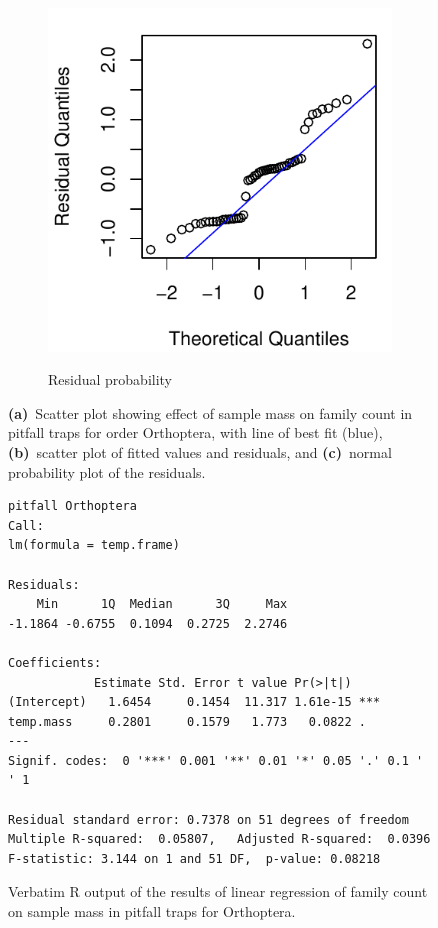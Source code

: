 \documentclass[10pt,letterpaper,twocolumn]{article}
\begin{document}
\begin{figure}[h]
\begin{subfigure}[b]{0.15\textwidth}
		\label{fig:pitfall_orthoptera_resid}
	\end{subfigure}
	~
	\begin{subfigure}[b]{0.15\textwidth}
		\caption{Residual probability}
		\includegraphics[width=\textwidth]{plots/mass-vs-count/qqplot/2015_pitfall_Orthoptera_qqplot.pdf}
		\label{fig:pitfall_orthoptera_qqplot}
	\end{subfigure}
	\caption{\textbf{(a)}~Scatter plot showing effect of sample mass on family count in pitfall traps for order Orthoptera, with line of best fit (blue), \textbf{(b)}~scatter plot of fitted values and residuals, and \textbf{(c)}~normal probability plot of the residuals.}
	\label{fig:pitfall_orthoptera}
	\smallskip
	\nointerlineskip
	\hrulefill
\end{figure}

\begin{figure}[h]
	\lstset{numbers=left}
	\lstset{xleftmargin=5mm,framexleftmargin=5mm}
	\begin{lstlisting}
pitfall Orthoptera
Call:
lm(formula = temp.frame)

Residuals:
    Min      1Q  Median      3Q     Max 
-1.1864 -0.6755  0.1094  0.2725  2.2746 

Coefficients:
            Estimate Std. Error t value Pr(>|t|)    
(Intercept)   1.6454     0.1454  11.317 1.61e-15 ***
temp.mass     0.2801     0.1579   1.773   0.0822 .  
---
Signif. codes:  0 '***' 0.001 '**' 0.01 '*' 0.05 '.' 0.1 ' ' 1

Residual standard error: 0.7378 on 51 degrees of freedom
Multiple R-squared:  0.05807,	Adjusted R-squared:  0.0396 
F-statistic: 3.144 on 1 and 51 DF,  p-value: 0.08218
	\end{lstlisting}
	\caption{Verbatim R output of the results of linear regression of family count on sample mass in pitfall traps for Orthoptera.}
	\label{fig:pitfall_orthoptera_regression}
	\smallskip
	\nointerlineskip
	\hrulefill
\end{figure}
\end{document}
